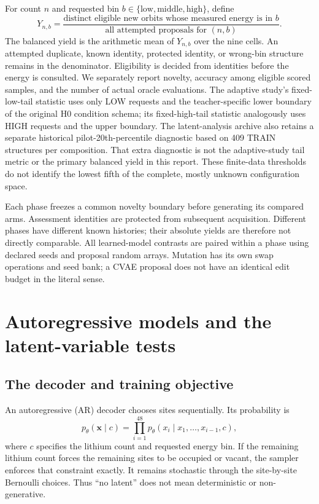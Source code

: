 \documentclass[11pt]{article}
\begin{document}
For count $n$ and requested bin $b\in\{\mathrm{low,middle,high}\}$, define
\begin{equation}
Y_{n,b}=\frac{\text{distinct eligible new orbits whose measured energy is in }b}
                 {\text{all attempted proposals for }(n,b)}.
\label{eq:yield}
\end{equation}
The balanced yield is the arithmetic mean of $Y_{n,b}$ over the nine cells.
An attempted duplicate, known identity, protected identity, or wrong-bin
structure remains in the denominator. Eligibility is decided from identities
before the energy is consulted. We separately report novelty, accuracy among
eligible scored samples, and the number of actual oracle evaluations. The
adaptive study's fixed-low-tail statistic uses only LOW requests and the
teacher-specific lower boundary of the original H0 condition schema; its
fixed-high-tail statistic analogously uses HIGH requests and the upper
boundary. The latent-analysis archive also retains a separate historical
pilot-20th-percentile diagnostic based on 409 TRAIN structures per
composition. That extra diagnostic is not the adaptive-study tail metric or
the primary balanced yield in this report. These finite-data thresholds do
not identify the lowest fifth of the complete, mostly unknown configuration
space.

Each phase freezes a common novelty boundary before generating its compared
arms. Assessment identities are protected from subsequent acquisition.
Different phases have different known histories; their absolute yields are
therefore not directly comparable. All learned-model contrasts are paired
within a phase using declared seeds and proposal random arrays. Mutation has
its own swap operations and seed bank; a CVAE proposal does not have an
identical edit budget in the literal sense.

\section{Autoregressive models and the latent-variable tests}
\subsection{The decoder and training objective}
An autoregressive (AR) decoder chooses sites sequentially. Its probability is
\begin{equation}
p_\theta(\mathbf x\mid c)=\prod_{i=1}^{48}
p_\theta(x_i\mid x_1,\ldots,x_{i-1},c),
\end{equation}
where $c$ specifies the lithium count and requested energy bin. If the
remaining lithium count forces the remaining sites to be occupied or vacant,
the sampler enforces that constraint exactly. It remains stochastic through
the site-by-site Bernoulli choices. Thus ``no latent'' does not mean
deterministic or non-generative.
\end{document}
